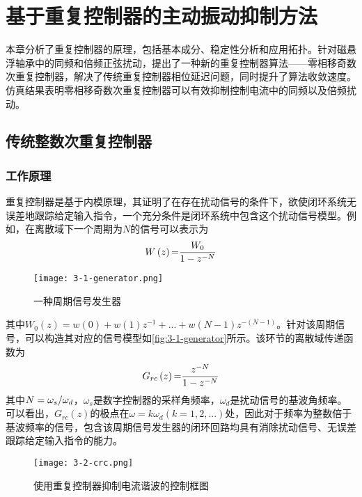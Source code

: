 \documentclass[
  lang=cn,
  degree=master,
  openany,oneside
]{nuaathesis}
\begin{document}
\chapter{基于重复控制器的主动振动抑制方法}
本章分析了重复控制器的原理，包括基本成分、稳定性分析和应用拓扑。针对磁悬浮轴承中的同频和倍频正弦扰动，提出了一种新的重复控制器算法——零相移奇数次重复控制器，解决了传统重复控制器相位延迟问题，同时提升了算法收敛速度。仿真结果表明零相移奇数次重复控制器可以有效抑制控制电流中的同频以及倍频扰动。
\section{传统整数次重复控制器}
\subsection{工作原理}
重复控制器是基于内模原理\cite{francis1975internal}，其证明了在存在扰动信号的条件下，欲使闭环系统无误差地跟踪给定输入指令，一个充分条件是闭环系统中包含这个扰动信号模型。例如，在离散域下一个周期为$N$的信号可以表示为
\begin{equation}
\label{eq3-1}
W\left( z \right){\rm{ = }}{{{W_0}} \over {1 - {z^{ - N}}}}
\end{equation}

\begin{figure}[h!]
	\texttt{[image: 3-1-generator.png]}
	\caption{一种周期信号发生器}
	\label{fig:3-1-generator}
\end{figure}

其中${W_0}\left( z \right) = w\left( 0 \right) + w\left( 1 \right){z^{ - 1}} + ... + w\left( {N - 1} \right){z^{ - \left( {N - 1} \right)}}$。针对该周期信号，可以构造其对应的信号模型如\autoref{fig:3-1-generator}所示。该环节的离散域传递函数为
\begin{equation}
\label{eq3-2}
{G_{rc}}\left( z \right){\rm{ = }}{{{z^{ - N}}} \over {1 - {z^{ - N}}}}
\end{equation}
其中$N = {{{\omega _s}} \mathord{\left/
 {\vphantom {{{\omega _s}} {{\omega _d}}}} \right.
 \kern-\nulldelimiterspace} {{\omega _d}}}$，$\omega _s$是数字控制器的采样角频率，$\omega _d$是扰动信号的基波角频率。可以看出，$G_{rc}(z)$的极点在$\omega = k\omega_d(k = 1,2,...)$处，因此对于频率为整数倍于基波频率的信号，包含该周期信号发生器的闭环回路均具有消除扰动信号、无误差跟踪给定输入指令的能力。
 
\begin{figure}[h!]
	\texttt{[image: 3-2-crc.png]}
	\caption{使用重复控制器抑制电流谐波的控制框图}
	\label{fig:3-2-crc}
\end{figure}
\end{document}
